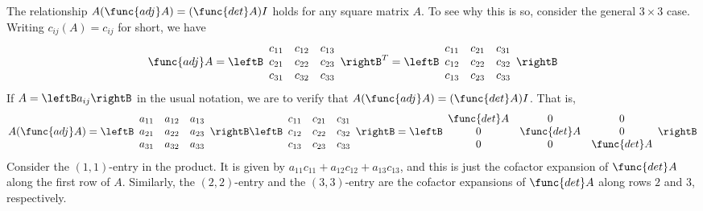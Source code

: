 The relationship $A(\func{adj } A) = (\func{det }A)I$ holds for any square matrix $A$. To see why this is so, consider the general $3 \times 3$ case. Writing $c_{ij}(A) = c_{ij}$ for short, we have
\begin{equation*}
\func{adj } A = \leftB \begin{array}{rrr}
c_{11} & c_{12} & c_{13} \\
c_{21} & c_{22} & c_{23} \\
c_{31} & c_{32} & c_{33} 
\end{array}\rightB^T = \leftB \begin{array}{rrr}
c_{11} & c_{21} & c_{31} \\
c_{12} & c_{22} & c_{32} \\
c_{13} & c_{23} & c_{33} 
\end{array}\rightB
\end{equation*}
If $A = \leftB a_{ij} \rightB$ in the usual notation, we are to verify that $A(\func{adj }A) = (\func{det }A)I$. That is,
\begin{equation*}
A(\func{adj } A) =\leftB \begin{array}{rrr}
a_{11} & a_{12} & a_{13} \\
a_{21} & a_{22} & a_{23} \\
a_{31} & a_{32} & a_{33} 
\end{array}\rightB \leftB \begin{array}{rrr}
c_{11} & c_{21} & c_{31} \\
c_{12} & c_{22} & c_{32} \\
c_{13} & c_{23} & c_{33}
\end{array}\rightB
 = \leftB \begin{array}{ccc}
\func{det } A & 0 & 0 \\
0 & \func{det } A & 0 \\
0 & 0 & \func{det } A
\end{array}\rightB
\end{equation*}
Consider the $(1, 1)$-entry in the product. It is given by $a_{11}c_{11} + a_{12}c_{12} + a_{13}c_{13}$, and this is just the cofactor expansion of $\func{det }A$ along the first row of $A$. Similarly, the $(2, 2)$-entry and the $(3, 3)$-entry are the cofactor expansions of $\func{det }A$ along rows $2$ and $3$, respectively.


